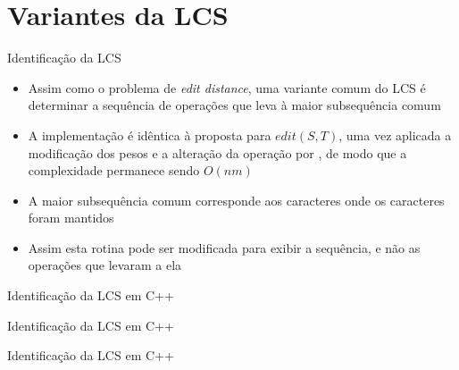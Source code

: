 \section{Variantes da LCS}

\begin{frame}[fragile]{Identificação da LCS}

    \begin{itemize}
        \item Assim como o problema de \textit{edit distance}, uma variante comum do LCS é
            determinar a sequência de operações que leva à maior subsequência comum

        \item A implementação é idêntica à proposta para $edit(S, T)$, uma vez aplicada a 
            modificação dos pesos e a alteração da operação  por 
            , de modo que a complexidade permanece sendo $O(nm)$

        \item A maior subsequência comum corresponde aos caracteres onde os caracteres foram
            mantidos

        \item Assim esta rotina pode ser modificada para exibir a sequência, e não as operações
            que levaram a ela
    \end{itemize}

\end{frame}

\begin{frame}[fragile]{Identificação da LCS em C++}
\end{frame}

\begin{frame}[fragile]{Identificação da LCS em C++}
\end{frame}

\begin{frame}[fragile]{Identificação da LCS em C++}
\end{frame}

